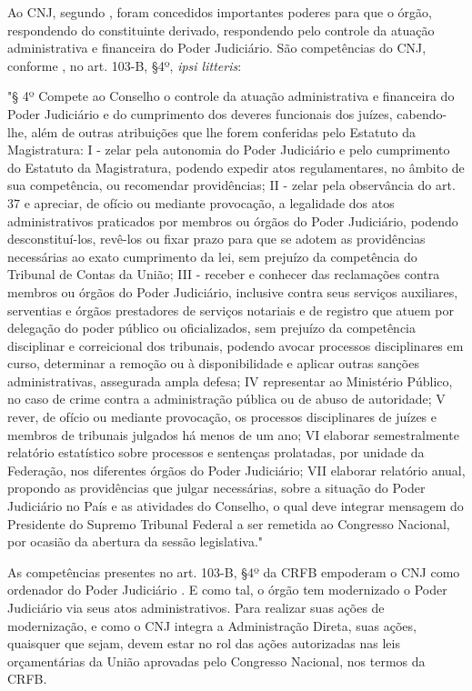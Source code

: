 Ao CNJ, segundo \cite{silva2013transparencia}, foram concedidos importantes poderes para que o órgão, respondendo do constituinte derivado, respondendo pelo controle da atuação administrativa e financeira do Poder Judiciário. São competências do CNJ, conforme \cite{cf88}, no art. 103-B, §4º, \textit{ipsi litteris}:

"§ 4º Compete ao Conselho o controle da atuação administrativa e financeira do Poder Judiciário e do cumprimento dos deveres funcionais dos juízes, cabendo-lhe, além de outras atribuições que lhe forem conferidas pelo Estatuto da Magistratura: I - zelar pela autonomia do Poder Judiciário e pelo cumprimento do Estatuto da Magistratura, podendo expedir atos regulamentares, no âmbito de sua competência, ou recomendar providências; II - zelar pela observância do art. 37 e apreciar, de ofício ou mediante provocação, a legalidade dos atos administrativos praticados por membros ou órgãos do Poder Judiciário, podendo desconstituí-los, revê-los ou fixar prazo para que se adotem as providências necessárias ao exato cumprimento da lei, sem prejuízo da competência do Tribunal de Contas da União; III - receber e conhecer das reclamações contra membros ou órgãos do Poder Judiciário, inclusive contra seus serviços auxiliares, serventias e órgãos prestadores de serviços notariais e de registro que atuem por delegação do poder público ou oficializados, sem prejuízo da competência disciplinar e correicional dos tribunais, podendo avocar processos disciplinares em curso, determinar a remoção ou à disponibilidade e aplicar outras sanções administrativas, assegurada ampla defesa; IV representar ao Ministério Público, no caso de crime contra a administração pública ou de abuso de autoridade; V rever, de ofício ou mediante provocação, os processos disciplinares de juízes e membros de tribunais julgados há menos de um ano; VI elaborar semestralmente relatório estatístico sobre processos e sentenças prolatadas, por unidade da Federação, nos diferentes órgãos do Poder Judiciário;    VII elaborar relatório anual, propondo as providências que julgar necessárias, sobre a situação do Poder Judiciário no País e as atividades do Conselho, o qual deve integrar mensagem do Presidente do Supremo Tribunal Federal a ser remetida ao Congresso Nacional, por ocasião da abertura da sessão legislativa."          

As competências presentes no art. 103-B, §4º da CRFB empoderam o CNJ como ordenador do Poder Judiciário . E como tal, o órgão tem modernizado o Poder Judiciário via seus atos administrativos. Para realizar suas ações de modernização, e como o CNJ integra a Administração Direta, suas ações, quaisquer que sejam, devem estar no rol das ações autorizadas nas leis orçamentárias da União aprovadas pelo Congresso Nacional, nos termos da CRFB.

